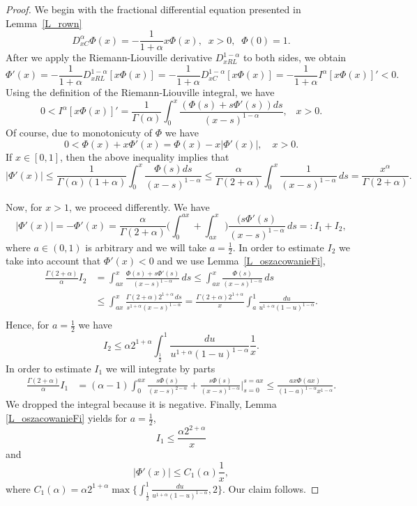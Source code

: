 \documentclass{article}
\begin{document}
\begin{proof}
We begin with the fractional differential equation presented in Lemma~\ref{L_rown}
\begin{equation}
    D^\alpha_{xC}\Phi(x)=-\frac{1}{1+\alpha} x\Phi(x),\;\; x>0,\;\; \Phi(0)=1.
\end{equation}
After we apply  the Riemann-Liouville derivative $D^{1-\alpha}_{xRL}$ to both sides, %
we obtain
$$\Phi'(x)=-\frac{1}{1+\alpha}D^{1-\alpha}_{xRL}[x\Phi(x)]=-\frac{1}{1+\alpha}D^{1-\alpha}_{xC}[x\Phi(x)]=-\frac{1}{1+\alpha}I^{\alpha}[x\Phi(x)]'<0.$$
Using the definition of the Riemann-Liouville integral, we have
$$0<I^{\alpha}[x\Phi(x)]'=\frac{1}{\Gamma(\alpha)}\int_0^x{\frac{(\Phi(s)+s\Phi '(s))ds}{(x-s)^{1-\alpha}}},\;\;\;x>0.$$
Of course, due to monotonicuty of $\Phi$ we have
$$0< \Phi(x)+x\Phi '(x)=\Phi(x)-x|\Phi '(x)|,\quad x>0.$$
If $x\in [0,1]$, then the above inequality implies that
$$
| \Phi'(x)| \le \frac{1}{\Gamma(\alpha)(1+\alpha)}\int_0^x{\frac{\Phi(s)ds}{(x-s)^{1-\alpha}}} \le \frac{\alpha}{\Gamma(2+\alpha)}\int_0^x\frac{1 }{(x-s)^{1-\alpha}}
\, ds = \frac{x^\alpha}{\Gamma(2+\alpha)}.$$


Now, for $x>1$, we proceed differently. We have
$$
|\Phi'(x)| = - \Phi'(x) =
\frac\alpha{\Gamma(2+\alpha)} \bigg(\int_0^{ax} + \int_{ax}^x\bigg) \frac{(s\Phi'(s)}{(x-s)^{1-\alpha}}\, ds=: I_1 + I_2,
$$
where $a\in (0,1)$ is arbitrary and we will take $a=\frac12$. In order to estimate $I_2$ we take into account that $\Phi'(x)<0$ and we use Lemma~\ref{L_oszacowanieFi},
\begin{align*}
\frac{\Gamma(2+\alpha)}\alpha I_2 &=  \int_{ax}^x 
\frac{\Phi(s) + s \Phi'(s)}{(x-s)^{1-\alpha}}\, ds
\le \int_{ax}^x 
\frac{ \Phi(s) }{(x-s)^{1-\alpha}}\, ds \\
&\le  \int_{ax}^x 
\frac{ \Gamma(2+\alpha) 2^{1+\alpha}\, ds }{s^{1+\alpha}(x-s)^{1-\alpha}} 
= \frac {\Gamma(2+\alpha) 2^{1+\alpha}}x \int_a^1 \frac{du}{ u^{1+\alpha}(1-u)^{1-\alpha}}.\\
\end{align*}
Hence, for $a= \frac12$ we have
$$
I_2 \le \alpha 2^{1+\alpha} \int_{\frac12}^1 \frac{du}{ u^{1+\alpha}(1-u)^{1-\alpha}} \frac 1 x.
$$
In order to estimate $I_1$ we will integrate by parts
\begin{align*}
\frac{\Gamma(2+\alpha)}\alpha I_1 &=  (\alpha-1)\int^{ax}_0 \frac{s\Phi(s)}{(x-s)^{2-\alpha}} + \frac{s\Phi(s)}{(x-s)^{1-\alpha}}\bigg|_{s=0}^{s=ax}\le \frac{ax \Phi(ax)}{(1-a)^{1-\alpha}x^{1-\alpha}}.
\end{align*}
We dropped the integral because it is negative. Finally, Lemma \ref{L_oszacowanieFi} yields for $a=\frac12$,
$$
I_1 \le \frac{\alpha 2^{2+\alpha}} x
$$
and
$$
|\Phi'(x)| \le C_1(\alpha) \frac 1x,
$$
where $ C_1(\alpha) = \alpha 2^{1+\alpha}\max\{\int_{\frac12}^1 \frac{du}{ u^{1+\alpha}(1-u)^{1-\alpha}}, 2\}. $
Our claim follows.
\end{proof}
\end{document}
